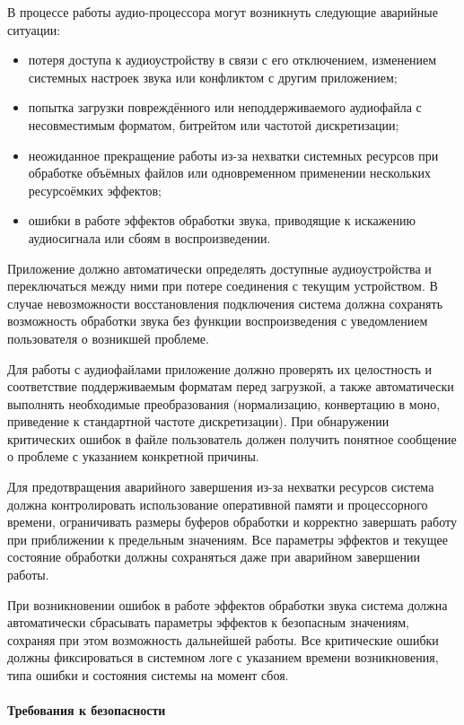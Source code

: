 В процессе работы аудио-процессора могут возникнуть следующие аварийные ситуации:
\begin{itemize}
	\item потеря доступа к аудиоустройству в связи с его отключением, изменением системных настроек звука или конфликтом с другим приложением;
	\item попытка загрузки повреждённого или неподдерживаемого аудиофайла с несовместимым форматом, битрейтом или частотой дискретизации;
	\item неожиданное прекращение работы из-за нехватки системных ресурсов при обработке объёмных файлов или одновременном применении нескольких ресурсоёмких эффектов;
	\item ошибки в работе эффектов обработки звука, приводящие к искажению аудиосигнала или сбоям в воспроизведении.
\end{itemize}

Приложение должно автоматически определять доступные аудиоустройства и переключаться между ними при потере соединения с текущим устройством. В случае невозможности восстановления подключения система должна сохранять возможность обработки звука без функции воспроизведения с уведомлением пользователя о возникшей проблеме.

Для работы с аудиофайлами приложение должно проверять их целостность и соответствие поддерживаемым форматам перед загрузкой, а также автоматически выполнять необходимые преобразования (нормализацию, конвертацию в моно, приведение к стандартной частоте дискретизации). При обнаружении критических ошибок в файле пользователь должен получить понятное сообщение о проблеме с указанием конкретной причины.

Для предотвращения аварийного завершения из-за нехватки ресурсов система должна контролировать использование оперативной памяти и процессорного времени, ограничивать размеры буферов обработки и корректно завершать работу при приближении к предельным значениям. Все параметры эффектов и текущее состояние обработки должны сохраняться даже при аварийном завершении работы.

При возникновении ошибок в работе эффектов обработки звука система должна автоматически сбрасывать параметры эффектов к безопасным значениям, сохраняя при этом возможность дальнейшей работы. Все критические ошибки должны фиксироваться в системном логе с указанием времени возникновения, типа ошибки и состояния системы на момент сбоя.

\paragraph{Требования к безопасности}

